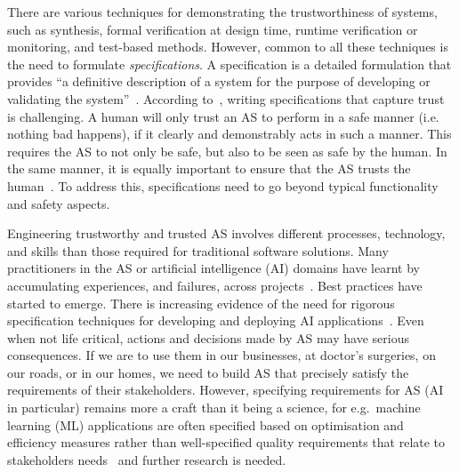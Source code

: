 \documentclass[sigconf,nonacm]{acmart}%
\begin{document}
	There are various techniques for demonstrating the trustworthiness of systems, such as synthesis, formal verification at design time, runtime verification or monitoring, and test-based methods. 
	However, common to all these techniques is the need to formulate \emph{specifications}. 
	A specification is a detailed formulation that provides ``a definitive description of a system for the purpose of developing or validating the system''~\cite{ISO24765:2017}.
	According to~\cite{Kress-Gazit2021}, writing specifications that capture trust is challenging. A human will only trust an AS to perform in a safe manner (i.e. nothing bad happens), if it clearly and demonstrably acts in such a manner. This requires the AS to not only be safe, but also to be seen as safe by the human. In the same manner, it is equally important to ensure that the AS trusts the human~\cite{Kress-Gazit2021}. To address this, specifications need to go beyond typical functionality and safety aspects.

	Engineering trustworthy and trusted AS involves different processes, technology, and skills than those required for traditional software solutions. Many  practitioners in the AS or artificial intelligence (AI) domains have learnt by accumulating experiences, and failures, across projects~\cite{AmershiBBDGKNN019}. Best practices have started to emerge. There is increasing evidence of the need for rigorous specification techniques for developing and deploying AI applications~\cite{damour2020}. Even when not life critical, actions and decisions made by AS may have serious consequences. If we are to use them in our businesses, at doctor’s surgeries, on our roads, or in our homes, we need to build AS that precisely satisfy the requirements of their stakeholders. However, specifying requirements for AS (AI in particular) remains more a craft than it being a science, for e.g.\ machine learning (ML) applications are often specified based on optimisation and efficiency measures rather than well-specified quality requirements that relate to stakeholders needs~\cite{IshikawaM20} and further research is needed.		
\end{document}
